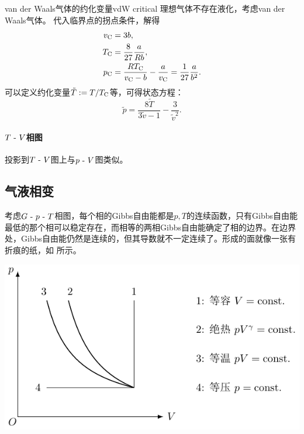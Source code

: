 \begin{example}
	{van der Waals气体的约化变量}{vdW critical}
	理想气体不存在液化，考虑van der Waals气体。
	代入临界点的拐点条件，解得
	\begin{subequations}
		\label{eq:vdW critical}
		\begin{align}
			v_\mathrm C&=3b,\\
			T_\mathrm C&=\frac{8}{27}\frac{a}{Rb},\\
			p_\mathrm C&=\frac{RT_\mathrm C}{v_\mathrm C-b}-\frac a{v_\mathrm C}=\frac1{27}\frac a{b^2}.
		\end{align}
	\end{subequations}
	可以定义约化变量$\tilde T:=T/T_\mathrm C$等，可得状态方程：
	\begin{equation}
		\tilde p=\frac{8\tilde T}{3\tilde v-1}-\frac3{\tilde v^2}.
	\end{equation}
\end{example}

\paragraph{$T~\text{-}~ V$相图}

投影到$T~\text{-}~ V$图上与$p~\text{-}~ V$图类似。

\subsection{气液相变}
\label{ssec:liquid-gas phase transition}

考虑$G~\text{-}~ p~\text{-}~ T$相图，每个相的Gibbs自由能都是$p,T$的连续函数，只有Gibbs自由能最低的那个相可以稳定存在，而相等的两相Gibbs自由能确定了相的边界。在边界处，Gibbs自由能仍然是连续的，但其导数就不一定连续了。形成的面就像一张有折痕的纸，如 所示。

\begin{center}
	\includegraphics[page=13]{figures/tikz/coordinates.pdf}
	\label{fig:phase G-p-T}
\end{center}

